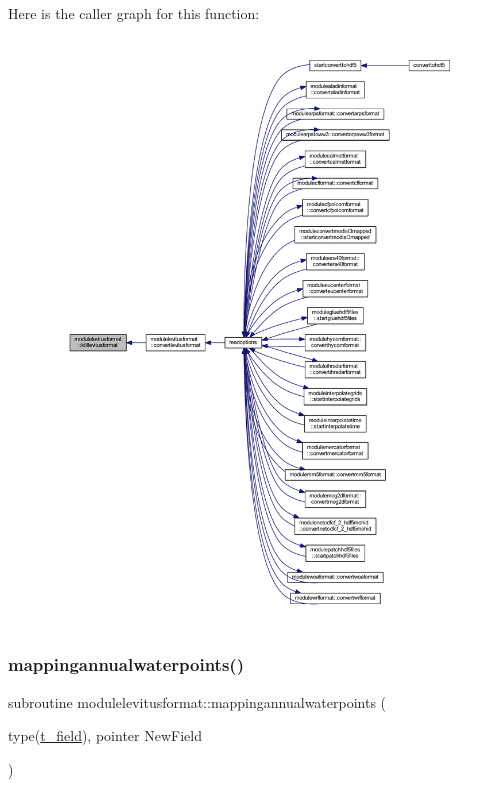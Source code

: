 Here is the caller graph for this function\+:\nopagebreak
\begin{figure}[H]
\begin{center}
\leavevmode
\includegraphics[width=350pt]{namespacemodulelevitusformat_aee602b5ad04c2069cd2ddaea3d922bf9_icgraph}
\end{center}
\end{figure}
\mbox{\label{namespacemodulelevitusformat_aeaf32cef0849c2f2d279062a6a41696a}} 
\subsubsection{\texorpdfstring{mappingannualwaterpoints()}{mappingannualwaterpoints()}}
{\footnotesize\ttfamily subroutine modulelevitusformat\+::mappingannualwaterpoints (\begin{DoxyParamCaption}\item[{type(\mbox{\hyperlink{structmodulelevitusformat_1_1t__field}{t\+\_\+field}}), pointer}]{New\+Field }\end{DoxyParamCaption})\hspace{0.3cm}{\ttfamily [private]}}

